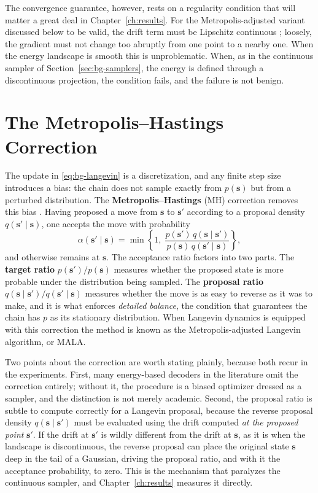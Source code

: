 The convergence guarantee, however, rests on a regularity condition that will matter a great deal in Chapter~\ref{ch:results}. For the Metropolis-adjusted variant discussed below to be valid, the drift term must be Lipschitz continuous \citep{roberts1996exponential}; loosely, the gradient must not change too abruptly from one point to a nearby one. When the energy landscape is smooth this is unproblematic. When, as in the continuous sampler of Section~\ref{sec:bg-samplers}, the energy is defined through a discontinuous projection, the condition fails, and the failure is not benign.

\section{The Metropolis--Hastings Correction}
\label{sec:bg-mh}

The update in \eqref{eq:bg-langevin} is a discretization, and any finite step size introduces a bias: the chain does not sample exactly from $p(\bm{s})$ but from a perturbed distribution. The \textbf{Metropolis--Hastings} (MH) correction removes this bias \citep{metropolis1953equation, hastings1970monte}. Having proposed a move from $\bm{s}$ to $\bm{s}'$ according to a proposal density $q(\bm{s}' \mid \bm{s})$, one accepts the move with probability
\begin{equation}
    \alpha(\bm{s}' \mid \bm{s}) = \min\left\{ 1,\; \frac{p(\bm{s}')\, q(\bm{s} \mid \bm{s}')}{p(\bm{s})\, q(\bm{s}' \mid \bm{s})} \right\},
    \label{eq:bg-mh}
\end{equation}
and otherwise remains at $\bm{s}$. The acceptance ratio factors into two parts. The \textbf{target ratio} $p(\bm{s}')/p(\bm{s})$ measures whether the proposed state is more probable under the distribution being sampled. The \textbf{proposal ratio} $q(\bm{s} \mid \bm{s}')/q(\bm{s}' \mid \bm{s})$ measures whether the move is as easy to reverse as it was to make, and it is what enforces \emph{detailed balance}, the condition that guarantees the chain has $p$ as its stationary distribution. When Langevin dynamics is equipped with this correction the method is known as the Metropolis-adjusted Langevin algorithm, or MALA.

Two points about the correction are worth stating plainly, because both recur in the experiments. First, many energy-based decoders in the literature omit the correction entirely; without it, the procedure is a biased optimizer dressed as a sampler, and the distinction is not merely academic. Second, the proposal ratio is subtle to compute correctly for a Langevin proposal, because the reverse proposal density $q(\bm{s} \mid \bm{s}')$ must be evaluated using the drift computed \emph{at the proposed point} $\bm{s}'$. If the drift at $\bm{s}'$ is wildly different from the drift at $\bm{s}$, as it is when the landscape is discontinuous, the reverse proposal can place the original state $\bm{s}$ deep in the tail of a Gaussian, driving the proposal ratio, and with it the acceptance probability, to zero. This is the mechanism that paralyzes the continuous sampler, and Chapter~\ref{ch:results} measures it directly.

